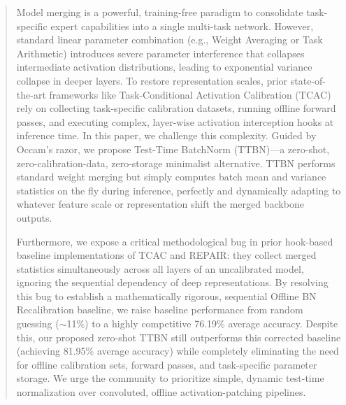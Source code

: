\documentclass{article}
\theoremstyle{plain}
\theoremstyle{definition}
\theoremstyle{remark}
\begin{document}

\printAffiliationsAndNotice{}

\begin{abstract}
  Model merging is a powerful, training-free paradigm to consolidate task-specific expert capabilities into a single multi-task network. However, standard linear parameter combination (e.g., Weight Averaging or Task Arithmetic) introduces severe parameter interference that collapses intermediate activation distributions, leading to exponential variance collapse in deeper layers. To restore representation scales, prior state-of-the-art frameworks like Task-Conditional Activation Calibration (TCAC) rely on collecting task-specific calibration datasets, running offline forward passes, and executing complex, layer-wise activation interception hooks at inference time. In this paper, we challenge this complexity. Guided by Occam's razor, we propose Test-Time BatchNorm (TTBN)—a zero-shot, zero-calibration-data, zero-storage minimalist alternative. TTBN performs standard weight merging but simply computes batch mean and variance statistics on the fly during inference, perfectly and dynamically adapting to whatever feature scale or representation shift the merged backbone outputs. 
  
  Furthermore, we expose a critical methodological bug in prior hook-based baseline implementations of TCAC and REPAIR: they collect merged statistics simultaneously across all layers of an uncalibrated model, ignoring the sequential dependency of deep representations. By resolving this bug to establish a mathematically rigorous, sequential Offline BN Recalibration baseline, we raise baseline performance from random guessing ($\sim$11\%) to a highly competitive 76.19\% average accuracy. Despite this, our proposed zero-shot TTBN still outperforms this corrected baseline (achieving 81.95\% average accuracy) while completely eliminating the need for offline calibration sets, forward passes, and task-specific parameter storage. We urge the community to prioritize simple, dynamic test-time normalization over convoluted, offline activation-patching pipelines.
\end{abstract}
\end{document}
